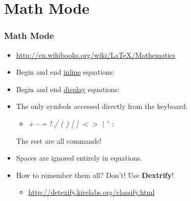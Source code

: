 \documentclass[notes=only]{beamer}
\newcommand{\snip}[1]
{
	
}
\begin{document}
\section{Math Mode}

\begin{frame} \frametitle{Math Mode}
    \begin{itemize}
    	\item \url{http://en.wikibooks.org/wiki/LaTeX/Mathematics}
        \item Begin and end \underline{inline} equations: \vspace{-6pt}
        \begin{itemize} \snip{inline.tex} \end{itemize}\vspace{-10pt}
        \item Begin and end \underline{display} equations:
        \begin{itemize} \snip{displayequation.tex} \end{itemize}
        \item The only symbols accessed directly from the keyboard:  
        \begin{itemize} \item \textit{+ - = ! / ( ) [ ] $< >$ $|$ $'$ :} \end{itemize}
        The rest are all commands!
        \item Spaces are ignored entirely in equations.
        \item How to remember them all?  Don't!  Use \textbf{Dextrify}!
        \begin{itemize} \item \url{http://detexify.kirelabs.org/classify.html} \end{itemize}
    \end{itemize}
\end{frame}
\end{document}
